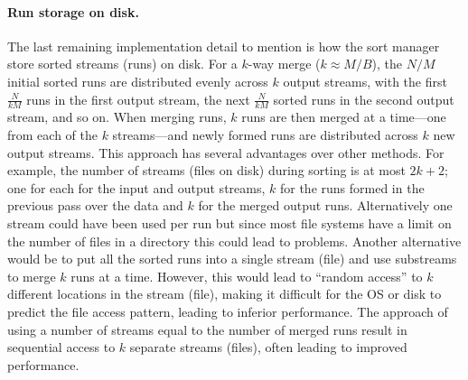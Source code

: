 \paragraph{Run storage on disk.} The last remaining implementation detail
to mention is how the sort manager store sorted streams (runs) on
disk.  For a $k$-way merge ($k\approx M/B$), the $N/M$ initial sorted
runs are distributed evenly across $k$ output streams, with the first
$\frac{N}{kM}$ runs in the first output stream, the next
$\frac{N}{kM}$ sorted runs in the second output stream, and so on.
When merging runs, $k$ runs are then merged at a time---one from each
of the $k$ streams---and newly formed runs are distributed across $k$
new output streams. This approach
has several advantages over other methods. For example, the number of
streams (files on disk) during sorting is at most $2k+2$; one for each
for the input and output streams, $k$ for the runs formed in the
previous pass over the data and $k$ for the merged output runs.
Alternatively one stream could have been used per run but since most
file systems have a limit on the number of files in a directory this
could lead to problems. Another alternative would be to put all the
sorted runs into a single stream (file) and use substreams to merge
$k$ runs at a time.  However, this would lead to ``random access'' to
$k$ different locations in the stream (file), making it difficult for
the OS or disk to predict the file access pattern, leading to inferior
performance.  The approach of using a number of streams equal to the
number of merged runs result in sequential access to $k$ separate
streams (files), often leading to improved performance.

